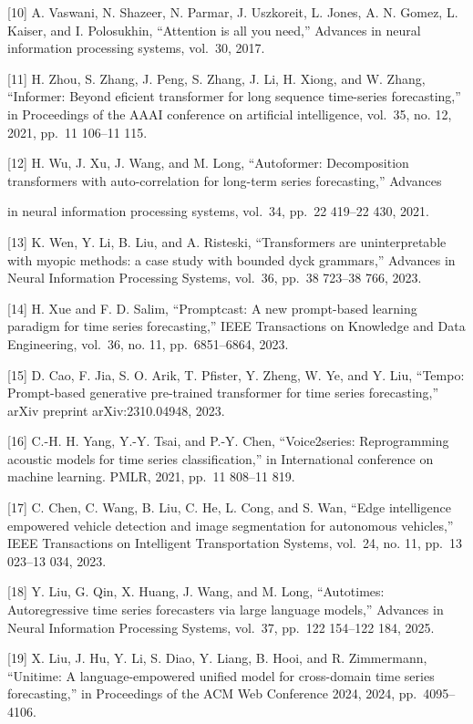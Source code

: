 \documentclass[
  10
]{article}
\begin{document}
{[}10{]} A. Vaswani, N. Shazeer, N. Parmar, J. Uszkoreit, L. Jones, A.
N. Gomez, L. Kaiser, and I. Polosukhin, ``Attention is all you need,''
Advances in neural information processing systems, vol.~30, 2017.

{[}11{]} H. Zhou, S. Zhang, J. Peng, S. Zhang, J. Li, H. Xiong, and W.
Zhang, ``Informer: Beyond eficient transformer for long sequence
time-series forecasting,'' in Proceedings of the AAAI conference on
artificial intelligence, vol.~35, no. 12, 2021, pp.~11 106--11 115.

{[}12{]} H. Wu, J. Xu, J. Wang, and M. Long, ``Autoformer: Decomposition
transformers with auto-correlation for long-term series forecasting,''
Advances

in neural information processing systems, vol.~34, pp.~22 419--22 430,
2021.

{[}13{]} K. Wen, Y. Li, B. Liu, and A. Risteski, ``Transformers are
uninterpretable with myopic methods: a case study with bounded dyck
grammars,'' Advances in Neural Information Processing Systems, vol.~36,
pp.~38 723--38 766, 2023.

{[}14{]} H. Xue and F. D. Salim, ``Promptcast: A new prompt-based
learning paradigm for time series forecasting,'' IEEE Transactions on
Knowledge and Data Engineering, vol.~36, no. 11, pp.~6851--6864, 2023.

{[}15{]} D. Cao, F. Jia, S. O. Arik, T. Pfister, Y. Zheng, W. Ye, and Y.
Liu, ``Tempo: Prompt-based generative pre-trained transformer for time
series forecasting,'' arXiv preprint arXiv:2310.04948, 2023.

{[}16{]} C.-H. H. Yang, Y.-Y. Tsai, and P.-Y. Chen, ``Voice2series:
Reprogramming acoustic models for time series classification,'' in
International conference on machine learning. PMLR, 2021, pp.~11 808--11
819.

{[}17{]} C. Chen, C. Wang, B. Liu, C. He, L. Cong, and S. Wan, ``Edge
intelligence empowered vehicle detection and image segmentation for
autonomous vehicles,'' IEEE Transactions on Intelligent Transportation
Systems, vol.~24, no. 11, pp.~13 023--13 034, 2023.

{[}18{]} Y. Liu, G. Qin, X. Huang, J. Wang, and M. Long, ``Autotimes:
Autoregressive time series forecasters via large language models,''
Advances in Neural Information Processing Systems, vol.~37, pp.~122
154--122 184, 2025.

{[}19{]} X. Liu, J. Hu, Y. Li, S. Diao, Y. Liang, B. Hooi, and R.
Zimmermann, ``Unitime: A language-empowered unified model for
cross-domain time series forecasting,'' in Proceedings of the ACM Web
Conference 2024, 2024, pp.~4095--4106.
\end{document}
